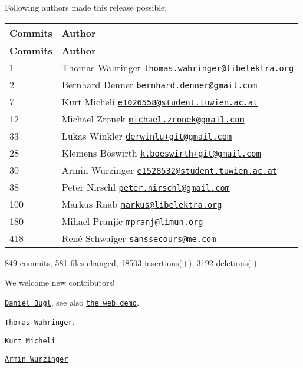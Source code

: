 Following authors made this release possible\+:

\tabulinesep=1mm
\begin{longtabu} spread 0pt [c]{*{2}{|X[-1]}|}
\hline
\rowcolor{\tableheadbgcolor}\textbf{ Commits }&\textbf{ Author  }\\
\endfirsthead
\hline
\endfoot
\hline
\rowcolor{\tableheadbgcolor}\textbf{ Commits }&\textbf{ Author  }\\
 &Thomas Wahringer \href{mailto:thomas.wahringer@libelektra.org}{\tt thomas.\+wahringer@libelektra.\+org} \\
2 &Bernhard Denner \href{mailto:bernhard.denner@gmail.com}{\tt bernhard.\+denner@gmail.\+com} \\
7 &Kurt Micheli \href{mailto:e1026558@student.tuwien.ac.at}{\tt e1026558@student.\+tuwien.\+ac.\+at} \\
12 &Michael Zronek \href{mailto:michael.zronek@gmail.com}{\tt michael.\+zronek@gmail.\+com} \\
33 &Lukas Winkler \href{mailto:derwinlu+git@gmail.com}{\tt derwinlu+git@gmail.\+com} \\
28 &Klemens Böswirth \href{mailto:k.boeswirth+git@gmail.com}{\tt k.\+boeswirth+git@gmail.\+com} \\
30 &Armin Wurzinger \href{mailto:e1528532@student.tuwien.ac.at}{\tt e1528532@student.\+tuwien.\+ac.\+at} \\
38 &Peter Nirschl \href{mailto:peter.nirschl@gmail.com}{\tt peter.\+nirschl@gmail.\+com} \\
100 &Markus Raab \href{mailto:markus@libelektra.org}{\tt markus@libelektra.\+org} \\
180 &Mihael Pranjic \href{mailto:mpranj@limun.org}{\tt mpranj@limun.\+org} \\
418 &René Schwaiger \href{mailto:sanssecours@me.com}{\tt sanssecours@me.\+com} \\
\end{longtabu}
849 commits, 581 files changed, 18503 insertions(+), 3192 deletions(-\/)

We welcome new contributors!


\begin{DoxyItemize}
\item \href{https://www.libelektra.org/ftp/elektra/publications/bugl2018web.pdf}{\tt Daniel Bugl}, see also \href{https://webdemo.libelektra.org/}{\tt the web demo}.
\item \href{https://www.libelektra.org/ftp/elektra/publications/wahringer2018notification.pdf}{\tt Thomas Wahringer}.
\item \href{https://www.libelektra.org/ftp/elektra/publications/micheli2018hybrid.pdf}{\tt Kurt Micheli}
\item \href{http://repositum.tuwien.ac.at/urn:nbn:at:at-ubtuw:1-115452}{\tt Armin Wurzinger}
\end{DoxyItemize}


